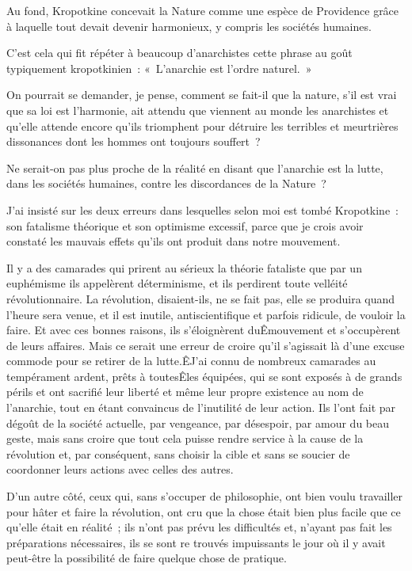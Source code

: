 \documentclass[french,twoside]{book} %
\begin{document}
Au fond, Kropotkine concevait la Nature comme une espèce de Providence grâce à laquelle tout devait devenir harmonieux, y compris les sociétés humaines.\par
C'est cela qui fit répéter à beaucoup d’anarchistes cette phrase au goût typiquement kropotkinien : « L'anarchie est l’ordre naturel. »\par
On pourrait se demander, je pense, comment se fait-il que la nature, s’il est vrai que sa loi est l’harmonie, ait attendu que viennent au monde les anarchistes et qu’elle attende encore qu’ils triomphent pour détruire les terribles et meurtrières dissonances dont les hommes ont toujours souffert ?\par
Ne serait-on pas plus proche de la réalité en disant que l’anarchie est la lutte, dans les sociétés humaines, contre les discordances de la Nature ?\par
J'ai insisté sur les deux erreurs dans lesquelles selon moi est tombé Kropotkine : son fatalisme théorique et son optimisme excessif, parce que je crois avoir constaté les mauvais effets qu’ils ont produit dans notre mouvement.\par
Il y a des camarades qui prirent au sérieux la théorie fataliste que par un euphémisme ils appelèrent déterminisme, et ils perdirent toute velléité révolutionnaire. La révolution, disaient-ils, ne se fait pas, elle se produira quand l’heure sera venue, et il est inutile, antiscientifique et parfois ridicule, de vouloir la faire. Et avec ces bonnes raisons, ils s’éloignèrent duÊmouvement et s’occupèrent de leurs affaires. Mais ce serait une erreur de croire qu’il s’agissait là d’une excuse commode pour se retirer de la lutte.ÊJ'ai connu de nombreux camarades au tempérament ardent, prêts à toutesÊles équipées, qui se sont exposés à de grands périls et ont sacrifié leur liberté et même leur propre existence au nom de l’anarchie, tout en étant convaincus de l’inutilité de leur action. Ils l’ont fait par dégoût de la société actuelle, par vengeance, par désespoir, par amour du beau geste, mais sans croire que tout cela puisse rendre service à la cause de la révolution et, par conséquent, sans choisir la cible et sans se soucier de coordonner leurs actions avec celles des autres.\par
D'un autre côté, ceux qui, sans s’occuper de philosophie, ont bien voulu travailler pour hâter et faire la révolution, ont cru que la chose était bien plus facile que ce qu’elle était en réalité ; ils n’ont pas prévu les difficultés et, n’ayant pas fait les préparations nécessaires, ils se sont re trouvés impuissants le jour où il y avait peut-être la possibilité de faire quelque chose de pratique.\par
\end{document}
